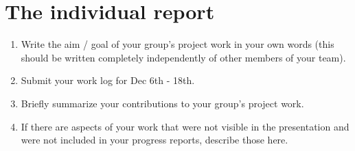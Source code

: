 \documentclass[12pt,letterpaper,noanswers]{exam}
\begin{document}
\section{The individual report}
\begin{enumerate}
    \item Write the aim / goal of your group's project work in your own words (this should be written completely independently of other members of your team).
    \item Submit your work log for Dec 6th - 18th.
    \item Briefly summarize your contributions to your group's project work.
    \item If there are aspects of your work that were not visible in the presentation and were not included in your progress reports, describe those here.  
        
\end{enumerate}
\end{document}
